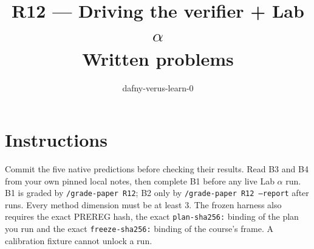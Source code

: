 \documentclass[11pt]{article}
\title{R12 --- Driving the verifier + Lab $\alpha$ \\ \large Written problems}
\author{dafny-verus-learn-0}
\date{}
\begin{document}
\maketitle
\sloppy
\section*{Instructions}
Commit the five native predictions before checking their results. Read B3 and B4
from your own pinned local notes, then complete B1 before any live Lab $\alpha$
run. B1 is graded by \texttt{/grade-paper R12}; B2 only by
\texttt{/grade-paper R12 --report} after runs. Every method dimension must be at
least 3. The frozen harness also requires the exact PREREG hash, the exact
\texttt{plan-sha256:} binding of the plan you run and the exact
\texttt{freeze-sha256:} binding of the course's frame. A calibration fixture
cannot unlock a run.
\end{document}
